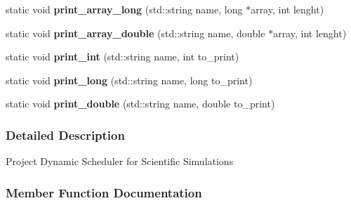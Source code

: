 \begin{DoxyCompactItemize}
\item 
\hypertarget{a00020_a4d799b7d836c4d1c2bb481e206079826}{}static void {\bfseries print\+\_\+array\+\_\+long} (std\+::string name, long $\ast$array, int lenght)\label{a00020_a4d799b7d836c4d1c2bb481e206079826}

\item 
\hypertarget{a00020_abbc0d5844afd89efe1351a71a6a5c257}{}static void {\bfseries print\+\_\+array\+\_\+double} (std\+::string name, double $\ast$array, int lenght)\label{a00020_abbc0d5844afd89efe1351a71a6a5c257}

\item 
\hypertarget{a00020_af32d624a2767f630d05847a4220a3c61}{}static void {\bfseries print\+\_\+int} (std\+::string name, int to\+\_\+print)\label{a00020_af32d624a2767f630d05847a4220a3c61}

\item 
\hypertarget{a00020_a3166a321dcb27239644003c3de3edfde}{}static void {\bfseries print\+\_\+long} (std\+::string name, long to\+\_\+print)\label{a00020_a3166a321dcb27239644003c3de3edfde}

\item 
\hypertarget{a00020_ad44b442ff7cc0700be2b1190f1a90c7b}{}static void {\bfseries print\+\_\+double} (std\+::string name, double to\+\_\+print)\label{a00020_ad44b442ff7cc0700be2b1190f1a90c7b}

\end{DoxyCompactItemize}


\subsubsection{Detailed Description}
Project Dynamic Scheduler for Scientific Simulations 

\subsubsection{Member Function Documentation}
\hypertarget{a00020_a71d11c79c34b94a00dafc6bb52e17e58}{}
